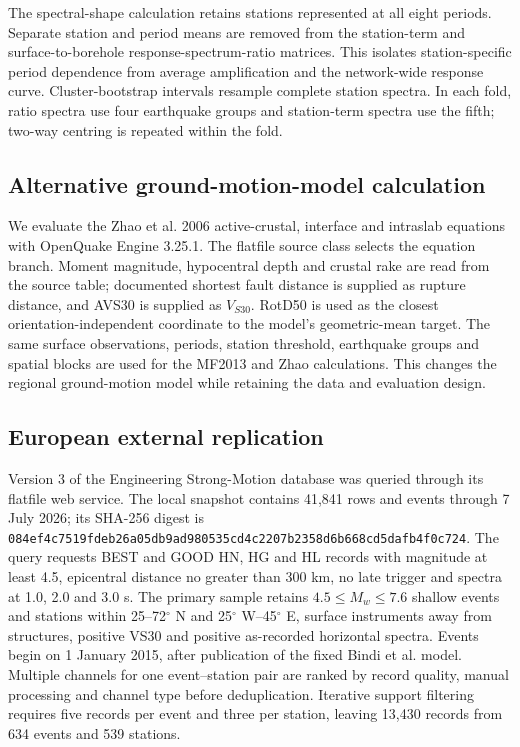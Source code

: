 \documentclass[10pt]{article}
\begin{document}
The spectral-shape calculation retains stations represented at all eight periods. Separate station and period means are removed from the station-term and surface-to-borehole response-spectrum-ratio matrices. This isolates station-specific period dependence from average amplification and the network-wide response curve. Cluster-bootstrap intervals resample complete station spectra. In each fold, ratio spectra use four earthquake groups and station-term spectra use the fifth; two-way centring is repeated within the fold.

\subsection*{Alternative ground-motion-model calculation}

We evaluate the Zhao et al. 2006 active-crustal, interface and intraslab equations with OpenQuake Engine 3.25.1\cite{zhao2006,pagani2014}. The flatfile source class selects the equation branch. Moment magnitude, hypocentral depth and crustal rake are read from the source table; documented shortest fault distance is supplied as rupture distance, and AVS30 is supplied as $V_{S30}$. RotD50 is used as the closest orientation-independent coordinate to the model's geometric-mean target. The same surface observations, periods, station threshold, earthquake groups and spatial blocks are used for the MF2013 and Zhao calculations. This changes the regional ground-motion model while retaining the data and evaluation design.

\subsection*{European external replication}

Version 3 of the Engineering Strong-Motion database was queried through its flatfile web service\cite{esm2026}. The local snapshot contains 41,841 rows and events through 7 July 2026; its SHA-256 digest is \texttt{084ef4c7519fdeb2}\allowbreak\texttt{6a05db9ad980535c}\allowbreak\texttt{d4c2207b2358d6b6}\allowbreak\texttt{68cd5dafb4f0c724}. The query requests BEST and GOOD HN, HG and HL records with magnitude at least 4.5, epicentral distance no greater than 300 km, no late trigger and spectra at 1.0, 2.0 and 3.0 s. The primary sample retains $4.5\leq M_w\leq7.6$ shallow events and stations within 25--72$^\circ$ N and 25$^\circ$ W--45$^\circ$ E, surface instruments away from structures, positive VS30 and positive as-recorded horizontal spectra. Events begin on 1 January 2015, after publication of the fixed Bindi et al. model\cite{bindi2014}. Multiple channels for one event--station pair are ranked by record quality, manual processing and channel type before deduplication. Iterative support filtering requires five records per event and three per station, leaving 13,430 records from 634 events and 539 stations.
\end{document}

